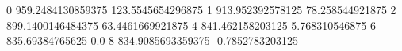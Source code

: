 0 959.2484130859375 123.5545654296875
1 913.952392578125 78.258544921875
2 899.1400146484375 63.4461669921875
4 841.462158203125 5.768310546875
6 835.69384765625 0.0
8 834.9085693359375 -0.7852783203125
